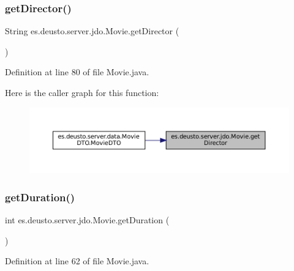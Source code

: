 \subsubsection{\texorpdfstring{getDirector()}{getDirector()}}
{\footnotesize\ttfamily String es.\+deusto.\+server.\+jdo.\+Movie.\+get\+Director (\begin{DoxyParamCaption}{ }\end{DoxyParamCaption})}



Definition at line 80 of file Movie.\+java.

Here is the caller graph for this function\+:\nopagebreak
\begin{figure}[H]
\begin{center}
\leavevmode
\includegraphics[width=350pt]{classes_1_1deusto_1_1server_1_1jdo_1_1_movie_a4fae4f67472a1a789c1b926ce5417fe1_icgraph}
\end{center}
\end{figure}
\mbox{\label{classes_1_1deusto_1_1server_1_1jdo_1_1_movie_a3c056812ade3ddfa59723e5181c90206}} 
\subsubsection{\texorpdfstring{getDuration()}{getDuration()}}
{\footnotesize\ttfamily int es.\+deusto.\+server.\+jdo.\+Movie.\+get\+Duration (\begin{DoxyParamCaption}{ }\end{DoxyParamCaption})}



Definition at line 62 of file Movie.\+java.

